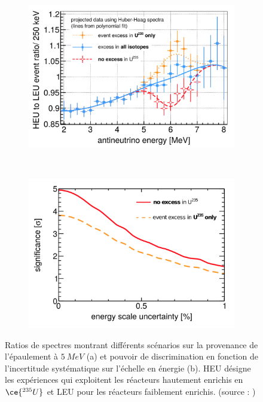 {\begin{figure}[h!]
\centering
\begin{subfigure}[b]{0.49\textwidth}
\centering
\includegraphics[width=1\textwidth]{images/bump_ratio.png}
\caption{}
\label{fig:bump_ratio.png}
\end{subfigure}
~ %
\begin{subfigure}[b]{0.49\textwidth}
\centering
\includegraphics[width=1\textwidth]{images/bump_ratio_Escale.png}
\caption{}
\label{fig:bump_ratio_Escale.png}
\end{subfigure}
\caption[Ratios de spectres montrant différents scénarios sur la provenance de l'épaulement à $\SI{5}{MeV}$]{Ratios de spectres montrant différents scénarios sur la provenance de l'épaulement à $\SI{5}{MeV}$ (a) et pouvoir de discrimination en fonction de l'incertitude systématique sur l'échelle en énergie (b). HEU désigne les expériences qui exploitent les réacteurs hautement enrichis en $\ce{^{235}U}$ et LEU pour les réacteurs faiblement enrichis. (source : \cite{Buck:2015clx})}
\label{fig:HEU_vs_LEU}
\end{figure}

}
